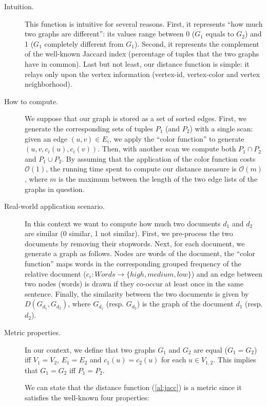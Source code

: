 \documentclass[12pt,a4paper]{article}
\begin{document}
\begin{description}
\item[Intuition.] This function is intuitive for several reasons. First, it represents ``how much two graphs are different'': its values range between 0 ($G_1$ equals to $G_2$) and 1 ($G_1$ completely different from $G_1$). Second, it represents the complement of the well-known Jaccard index (percentage of tuples that the two graphs have in common). Last but not least,  our distance function is simple: it relays only upon the vertex information (vertex-id, vertex-color and vertex neighborhood).

\item[How to compute.] We suppose that our graph is stored as a set of sorted edges. First, we generate the corresponding sets of tuples $P_1$ (and $P_2$) with a single scan: given an edge $(u, v) \in E_i$, we apply the ``color function'' to generate $(u, v, c_i(u), c_i(v))$. Then, with another scan we compute both $P_1 \cap P_2$  and $P_1 \cup P_2$. By assuming that the application of the color function costs $\mathcal{O}(1)$, the running time spent to compute our distance measure is $\mathcal{O}(m)$, where $m$ is the maximum between the length of the two edge lists of the graphs in question.

\item[Real-world application scenario.] In this context we want to compute how much two documents $d_1$ and $d_2$ are similar (0 similar, 1 not similar). First, we pre-process the two documents by removing their stopwords. Next, for each document, we generate a graph as follows. Nodes are words of the document, the ``color function'' maps words in the corresponding grouped frequency of the relative document ($c_i : Words \rightarrow \{high, medium, low\}$) and an edge between two nodes (words) is drawn if they co-occur at least once in the same sentence. Finally, the similarity between the two documents is given by $D(G_{d_1}, G_{d_2})$, where $G_{d_1}$ (resp. $G_{d_2}$) is the graph of the document $d_1$ (resp. $d_2$).


\item[Metric properties.] In our context, we define that two graphs $G_1$ and $G_2$ are equal ($G_1 = G_2$) iff $V_1 = V_2$, $E_1 = E_2$ and $c_1(u) = c_2(u)$ for each $u \in V_{1, 2}$. This implies that $G_1 = G_2$ iff $P_1 = P_2$.

We can state that the distance function (\ref{al:jacc}) is a metric since it satisfies the well-known four properties:


\end{description}
\end{document}

